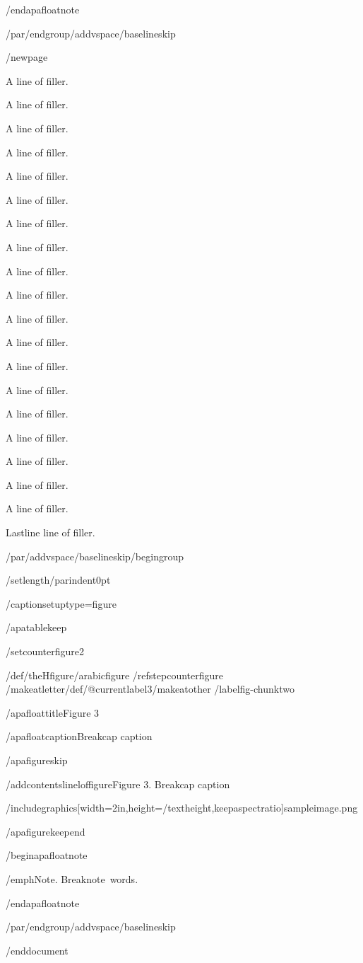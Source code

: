 /end{apafloatnote}

/par/endgroup/addvspace{/baselineskip}

/newpage{}

A line of filler.

A line of filler.

A line of filler.

A line of filler.

A line of filler.

A line of filler.

A line of filler.

A line of filler.

A line of filler.

A line of filler.

A line of filler.

A line of filler.

A line of filler.

A line of filler.

A line of filler.

A line of filler.

A line of filler.

A line of filler.

A line of filler.

Lastline line of filler.

/par/addvspace{/baselineskip}/begingroup

/setlength{/parindent}{0pt}

/captionsetup{type=figure}

/apatablekeep

/setcounter{figure}{2}

/def/theHfigure{/arabic{figure}}%
/refstepcounter{figure}%
/makeatletter/def/@currentlabel{3}/makeatother%
/label{fig-chunktwo}

/apafloattitle{Figure 3}

/apafloatcaption{Breakcap caption}

/apafigureskip

/addcontentsline{lof}{figure}{Figure 3. Breakcap caption}

/includegraphics[width=2in,height=/textheight,keepaspectratio]{sampleimage.png}

/apafigurekeepend

/begin{apafloatnote}

/emph{Note}. Breaknote~words.

/end{apafloatnote}

/par/endgroup/addvspace{/baselineskip}




/end{document}
